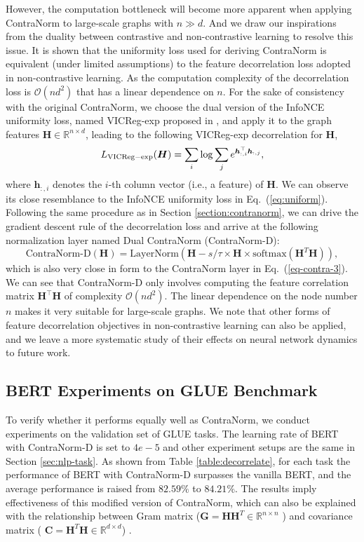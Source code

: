 \documentclass{article}
\def\vh{{\bm{h}}}
\def\mH{{\bm{H}}}
\def\gO{{\mathcal{O}}}
\def\sR{{\mathbb{R}}}
\theoremstyle{definition}
\theoremstyle{remark}
\theoremstyle{theorem}
\begin{document}
However, the computation bottleneck will become more apparent when applying ContraNorm to large-scale graphs with $n\gg d$. And we draw our inspirations from the duality between contrastive and non-contrastive learning \citep{garrido2022duality} to resolve this issue. It is shown that the uniformity loss used for deriving ContraNorm is equivalent (under limited assumptions) to the feature decorrelation loss adopted in non-contrastive learning. As the computation complexity of the decorrelation loss is $\gO(nd^2)$ that has a linear dependence on $n$. For the sake of consistency with the original ContraNorm, we choose the dual version of the InfoNCE uniformity loss, named VICReg-exp proposed in \cite{garrido2022duality}, and apply it to the graph features $\mH\in\sR^{n\times d}$, leading to the following VICReg-exp decorrelation for $\mH$,
\begin{equation}
L_{\rm VICReg-exp}(\mH)=\sum_{i}\log\sum_je^{\vh_{:,i}^\top \vh_{:,j}},
\end{equation}
where $\vh_{:,i}$ denotes the $i$-th column vector (i.e., a feature) of $\mH$. We can observe its close resemblance to the InfoNCE uniformity loss in Eq.~(\ref{eq:uniform}). Following the same procedure as in Section \ref{section:contranorm}, we can drive the gradient descent rule of the decorrelation loss and arrive at the following normalization layer named Dual ContraNorm (ContraNorm-D):
\begin{equation}
   \mbox{ContraNorm-D}(\mathbf{H}) = \mbox{LayerNorm}(\mathbf{H}-s/\tau \times \mathbf{H}\times\mbox{softmax}(\mathbf{H}^T\mathbf{H})), 
\end{equation}
which is also very close in form to the ContraNorm layer in Eq.~(\ref{eq-contra-3}).
We can see that ContraNorm-D only involves computing the feature correlation matrix $\mH^\top \mH$ of complexity $\gO(nd^2)$. The linear dependence on the node number $n$ makes it very suitable for large-scale graphs. We note that other forms of feature decorrelation objectives in non-contrastive learning \citep{zbontar2021barlow,bardes2021vicreg} can also be applied, and we leave a more systematic study of their effects on neural network dynamics to future work.


\subsection{BERT Experiments on GLUE Benchmark}

To verify whether it performs equally well as ContraNorm, we conduct experiments on the validation set of GLUE tasks. The learning rate of BERT with ContraNorm-D is set to $4e-5$ and other experiment setups are the same in Section \ref{sec:nlp-task}. As shown from Table \ref{table:decorrelate}, for each task the performance of BERT with ContraNorm-D surpasses the vanilla BERT, and the average performance is raised from $82.59\%$ to $84.21\%$. The results imply effectiveness of this modified version of ContraNorm, which can also be explained with the relationship between Gram matrix ($\mathbf{G} = \mathbf{H}\mathbf{H}^T \in \mathbb{R}^{n \times n}$ ) and covariance matrix ( $\mathbf{C} = \mathbf{H}^T\mathbf{H} \in \mathbb{R}^{d \times d}$) \citep{ali2021xcit}. 
\end{document}
